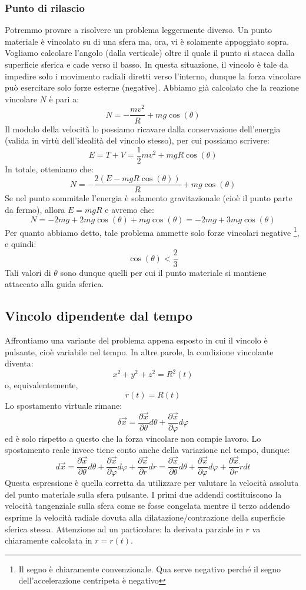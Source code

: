 \documentclass[a4paper,openany]{article}
\begin{document}
	\subsubsection{Punto di rilascio}
	Potremmo provare a risolvere un problema leggermente diverso. Un punto materiale è vincolato su di una sfera ma, ora, vi è solamente appoggiato sopra. Vogliamo calcolare l'angolo (dalla verticale) oltre il quale il punto si stacca dalla superficie sferica e cade verso il basso. In questa situazione, il vincolo è tale da impedire solo i movimento radiali diretti verso l'interno, dunque la forza vincolare può esercitare solo forze esterne (negative). Abbiamo già calcolato che la reazione vincolare $N$ è pari a:
	$$
	N = - \dfrac{mv^{2}}{R} + mg\cos(\theta)
	$$
	Il modulo della velocità lo possiamo ricavare dalla conservazione dell'energia (valida in virtù dell'idealità del vincolo stesso), per cui possiamo scrivere:
	$$
	E = T + V = \dfrac{1}{2}mv^{2}+mgR\cos(\theta)
	$$
	In totale, otteniamo che:
	$$
	N = -\dfrac{2(E-mgR\cos(\theta))}{R} + mg\cos(\theta)
	$$
	Se nel punto sommitale l'energia è solamento gravitazionale (cioè il punto parte da fermo), allora $E = mgR$ e avremo che:
	$$
	N =-2mg +2mg\cos(\theta) + mg\cos(\theta) = -2mg + 3mg\cos(\theta) 
	$$
	Per quanto abbiamo detto, tale problema ammette solo forze vincolari negative \footnote{Il segno è chiaramente convenzionale. Qua serve negativo perché il segno dell'accelerazione centripeta è negativo}, e quindi:
	$$
	\cos(\theta) < \dfrac{2}{3}
	$$
	Tali valori di $\theta$ sono dunque quelli per cui il punto materiale si mantiene attaccato alla guida sferica.
	\subsection{Vincolo dipendente dal tempo}
	Affrontiamo una variante del problema appena esposto in cui il vincolo è pulsante, cioè variabile nel tempo. In altre parole, la condizione vincolante diventa:
	\begin{equation}
		x^{2}+y^{2}+z^{2} = R^{2}(t)
	\end{equation}
	o, equivalentemente,
	$$
	r(t) = R(t)
	$$
	Lo spostamento virtuale rimane:
	$$
	\delta \vec{x} = \dfrac{\partial \vec{x}}{\partial \theta} d\theta + \dfrac{\partial \vec{x}}{\partial \varphi} d\varphi
	$$
	ed è solo rispetto a questo che la forza vincolare non compie lavoro. Lo spostamento reale invece tiene conto anche della variazione nel tempo, dunque:
	$$
	d\vec{x} = \dfrac{\partial \vec{x}}{\partial \theta} d\theta + \dfrac{\partial \vec{x}}{\partial \varphi} d\varphi + \dfrac{\partial \vec{x}}{\partial r}dr = \dfrac{\partial \vec{x}}{\partial \theta} d\theta + \dfrac{\partial \vec{x}}{\partial \varphi} d\varphi + \dfrac{\partial \vec{x}}{\partial r}\dot{r}dt
	$$
	Questa espressione è quella corretta da utilizzare per valutare la velocità assoluta del punto materiale sulla sfera pulsante. I primi due addendi costituiscono la velocità tangenziale sulla sfera come se fosse congelata mentre il terzo addendo esprime la velocità radiale dovuta alla dilatazione/contrazione della superficie sferica stessa. Attenzione ad un particolare: la derivata parziale in $r$ va chiaramente calcolata in $r=r(t)$.  
	
\end{document}
